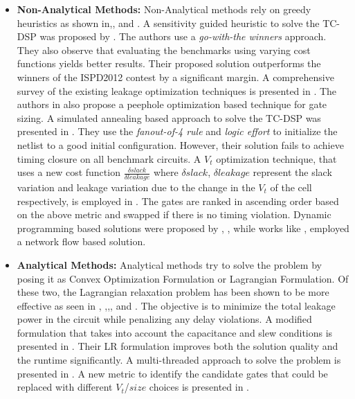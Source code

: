 \begin{itemize}
\item \textbf{Non-Analytical Methods:}  Non-Analytical methods rely on greedy heuristics as shown in\cite{hu:12},\cite{mok:12},\cite{reiman:13} and  %
\cite{rahman:12}. %
        A sensitivity guided heuristic to solve the TC-DSP was proposed by \cite{hu:12}. The authors use a \textit{go-with-the winners} approach. They also observe that evaluating the benchmarks using varying cost functions yields better results. Their proposed solution outperforms the winners of the ISPD2012 contest by a significant margin. A comprehensive survey of the existing leakage optimization techniques is presented in \cite{mok:12}. The authors in \cite{mok:12} also propose a peephole optimization based technique for gate sizing. A simulated annealing based approach to solve the TC-DSP was presented in \cite{reiman:13}. They use the \textit{fanout-of-4 rule} and \textit{logic effort} to initialize the netlist to a good initial configuration. However, their solution fails to achieve timing closure on all benchmark circuits. A $V_t$ optimization technique, that uses a new cost function  $\frac{\delta slack}{\delta leakage}$ where $ \delta slack$, $\delta leakage$ represent the slack variation and leakage variation due to the change in the $V_t$ of the cell respectively, is employed in \cite{rahman:12}. The gates are ranked in ascending order based on the above metric and swapped if there is no timing violation. 
        Dynamic programming based solutions were proposed by \cite{li:12}, \cite{Ketkar:09},\cite{Liu:09} while works like \cite{livramento:14}, \cite{ren:08} employed a network flow based solution. %


\item \textbf{Analytical Methods:} Analytical methods try to solve the problem by posing it as 
Convex Optimization Formulation or Lagrangian Formulation. Of these two, the Lagrangian relaxation problem has been shown to be more effective as seen in \cite{ozdal:12}, \cite{li:12},\cite{livramento:14},\cite{flach:13},\cite{livramento:13} and \cite{sharma:15}. The objective is to minimize the total leakage power in the circuit while penalizing any delay violations. A modified formulation that takes into account the capacitance and slew conditions is presented in \cite{li:12}. Their LR formulation improves both the solution quality and the runtime significantly. A multi-threaded approach to solve the problem is presented in \cite{sharma:15}. A new metric to identify the candidate gates that could be replaced with different $V_t$/$size$ choices is presented in \cite{reis:16}. 

\end{itemize}


